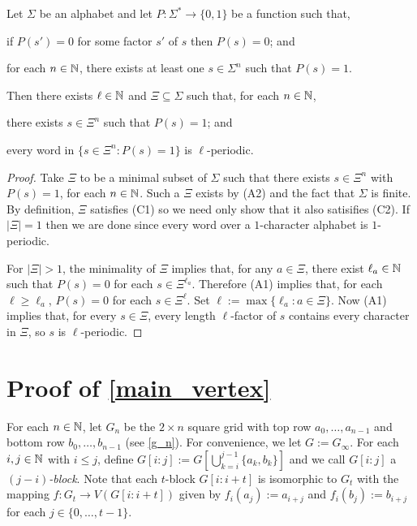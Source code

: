 \documentclass{patmorin}
\begin{document}
\begin{lem}\label{periodicity}
    Let $\Sigma$ be an alphabet and let $P:\Sigma^*\to\{0,1\}$ be a function such that,
    \begin{compactenum}[({A}1)]
        \item if $P(s')=0$ for some factor $s'$ of $s$ then $P(s)=0$; and
        \item for each $n\in\mathbb{N}$, there exists at least one $s\in \Sigma^n$ such that $P(s)=1$.
    \end{compactenum}
    Then there exists $\ell\in\mathbb{N}$ and $\Xi\subseteq\Sigma$ such that, for each $n\in\mathbb{N}$,
    \begin{compactenum}[(C1)]
        \item there exists $s\in\Xi^n$ such that $P(s)=1$; and
        \item every word in $\{s\in\Xi^n:P(s)=1\}$ is $\ell$-periodic.
    \end{compactenum}
\end{lem}

\begin{proof}
    Take $\Xi$ to be a minimal subset of $\Sigma$ such that there exists $s\in\Xi^n$ with $P(s)=1$, for each $n\in\mathbb{N}$.  Such a $\Xi$ exists by (A2) and the fact that $\Sigma$ is finite. By definition, $\Xi$ satisfies (C1) so we need only show that it also satisifies (C2).  If $|\Xi|=1$ then we are done since every word over a $1$-character alphabet is $1$-periodic.

    For $|\Xi|>1$, the minimality of $\Xi$ implies that, for any $a\in\Xi$, there exist $\ell_a\in\mathbb{N}$ such that $P(s)=0$ for each $s\in\Xi^{\ell_a}$.  Therefore (A1) implies that, for each $\ell\ge\ell_a$, $P(s)=0$ for each $s\in\Xi^{\ell}$. Set $\ell:=\max\{\ell_a:a\in \Xi\}$.  Now (A1) implies that, for every $s\in\Xi$, every length $\ell$-factor of $s$ contains every character in $\Xi$, so $s$ is $\ell$-periodic.
\end{proof}


\section{Proof of \cref{main_vertex}}
\label{vertex_colourings}

For each $n\in\mathbb{N}$, let $G_n$ be the $2\times n$ square grid with top row $a_0,\ldots,a_{n-1}$ and bottom row $b_0,\ldots,b_{n-1}$ (see \cref{g_n}). For convenience, we let $G:=G_\infty$.  For each $i,j\in\mathbb{N}$ with $i\le j$, define $G[i\mathbin{:}j]:=G[\bigcup_{k=i}^{j-1}\{a_k,b_k\}]$ and we call $G[i\mathbin{:}j]$ a \emph{$(j-i)$-block}. Note that each $t$-block $G[i\mathbin{:}i+t]$ is isomorphic to $G_t$ with the mapping $f:G_t\to V(G[i\mathbin{:}i+t])$ given by $f_i(a_{j}):=a_{i+j}$ and $f_i(b_{j}):=b_{i+j}$ for each $j\in\{0,\ldots,t-1\}$.
\end{document}
